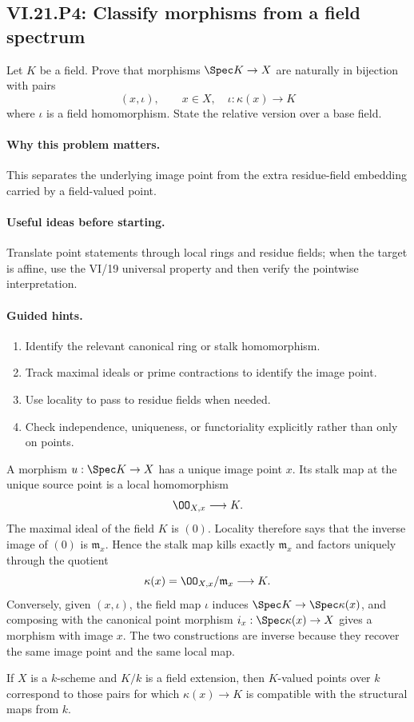 \subsection*{VI.21.P4: Classify morphisms from a field spectrum}
\begin{problem}\label{prob:vi21-p04}
Let $K$ be a field.  Prove that morphisms $\Spec K\to X$ are naturally in bijection with pairs
\[
(x,\iota),\qquad x\in X,\quad \iota:\kappa(x)\to K
\]
where $\iota$ is a field homomorphism.  State the relative version over a base field.
\end{problem}

\ifdefined\FullProblemDossiers
\paragraph{Why this problem matters.}
This separates the underlying image point from the extra residue-field embedding carried by a field-valued point.

\paragraph{Useful ideas before starting.}
Translate point statements through local rings and residue fields; when the target is affine, use the VI/19 universal property and then verify the pointwise interpretation.

\paragraph{Guided hints.}
\begin{enumerate}
\item Identify the relevant canonical ring or stalk homomorphism.
\item Track maximal ideals or prime contractions to identify the image point.
\item Use locality to pass to residue fields when needed.
\item Check independence, uniqueness, or functoriality explicitly rather than only on points.
\end{enumerate}

\begin{solution}
A morphism $u:\Spec K\to X$ has a unique image point $x$.  Its stalk map at the unique source
point is a local homomorphism
\[
\OO_{X,x}\longrightarrow K.
\]
The maximal ideal of the field $K$ is $(0)$.  Locality therefore says that the inverse image of
$(0)$ is $\mathfrak m_x$.  Hence the stalk map kills exactly $\mathfrak m_x$ and factors uniquely
through the quotient
\[
\kappa(x)=\OO_{X,x}/\mathfrak m_x\longrightarrow K.
\]
Conversely, given $(x,\iota)$, the field map $\iota$ induces
$\Spec K\to\Spec\kappa(x)$, and composing with the canonical point morphism
$i_x:\Spec\kappa(x)\to X$ gives a morphism with image $x$.  The two constructions are inverse
because they recover the same image point and the same local map.

If $X$ is a $k$-scheme and $K/k$ is a field extension, then $K$-valued points over $k$ correspond
to those pairs for which $\kappa(x)\to K$ is compatible with the structural maps from $k$.
\end{solution}

